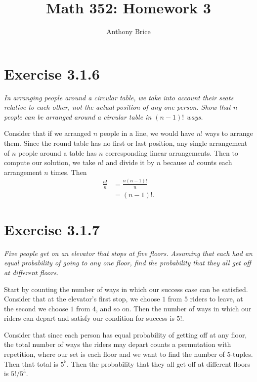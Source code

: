 \documentclass{tufte-handout}
\title{Math 352: Homework 3}
\author{Anthony Brice}
\begin{document}
\maketitle

\section{Exercise 3.1.6}

\emph{In arranging people around a circular table, we take into
    account their seats relative to each other, not the actual
    position of any one person. Show that $n$ people can be arranged
    around a circular table in $(n - 1)!$ ways.}

\bigskip

Consider that if we arranged $n$ people in a line, we would have $n!$
ways to arrange them. Since the round table has no first or last
position, any single arrangement of $n$ people around a table has $n$
corresponding linear arrangements. Then to compute our solution, we
take $n!$ and divide it by $n$ because $n!$ counts each arrangement
$n$ times. Then
\begin{align*}
\frac{n!}{n} &= \frac{n(n-1)!}{n}\\
&= (n-1)!.
\end{align*}

\section{Exercise 3.1.7}

\emph{Five people get on an elevator that stops at five
  floors. Assuming that each had an equal probability of going to any
  one floor, find the probability that they all get off at different
  floors.}

\bigskip

Start by counting the number of ways in which our success case can
be satisfied. Consider that at the elevator's first stop, we choose
$1$ from $5$ riders to leave, at the second we choose $1$ from $4$, and
so on. Then the number of ways in which our riders can depart and
satisfy our condition for success is $5!$.

Consider that since each person has equal probability of getting off
at any floor, the total number of ways the riders may depart counts a
permutation with repetition, where our set is each floor and we want
to find the number of $5$-tuples. Then that total is $5^5$. Then
the probability that they all get off at different floors is
$5! / 5^5$.
\end{document}
